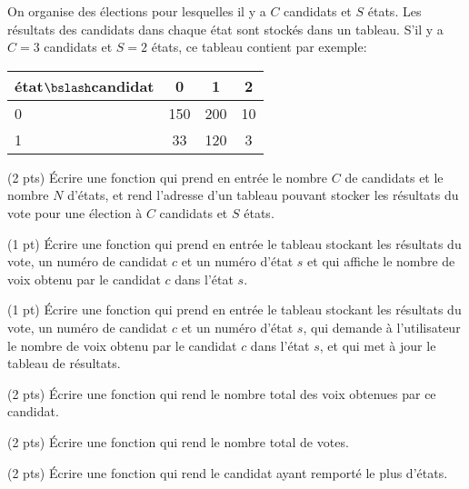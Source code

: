 
On organise des {\'e}lections pour lesquelles il y a $C$ candidats et $S$
{\'e}tats. Les r{\'e}sultats des candidats dans chaque {\'e}tat sont stock{\'e}s dans
un tableau. S'il y a $C=3$ candidats et $S=2$
{\'e}tats, ce tableau contient par exemple:
\begin{center}
  \begin{tabular}{|l|c|c|c|}
    \hline
    {\'e}tat$\bslash$candidat & 0 & 1 & 2 \\
    \hline
    0 & 150 & 200 & 10 \\
    \hline
    1 & 33 & 120 & 3 \\
    \hline
  \end{tabular}
\end{center}


\question (2 pts) {\'E}crire une fonction  qui prend en
  entr{\'e}e le nombre $C$ de candidats et le nombre $N$ d'{\'e}tats, et rend
  l'adresse d'un tableau pouvant stocker les
  r{\'e}sultats du vote pour une {\'e}lection {\`a} $C$ candidats et $S$ {\'e}tats.

\question (1 pt) {\'E}crire une fonction  qui prend
  en entr{\'e}e le tableau stockant les r{\'e}sultats du vote, un num{\'e}ro de
  candidat $c$ et un num{\'e}ro d'{\'e}tat $s$ et qui affiche le nombre de voix
  obtenu par le candidat $c$ dans l'{\'e}tat $s$.

\Question (1 pt) {\'E}crire une fonction  qui prend en
  entr{\'e}e le tableau stockant les r{\'e}sultats du vote, un num{\'e}ro de
  candidat $c$ et un num{\'e}ro d'{\'e}tat $s$, qui demande {\`a} l'utilisateur le
  nombre de voix obtenu par le candidat $c$ dans l'{\'e}tat $s$, et qui
  met {\`a} jour le tableau de r{\'e}sultats.

\Question (2 pts) {\'E}crire une fonction  qui rend le
  nombre total des voix obtenues par ce candidat.

\Question (2 pts) {\'E}crire une fonction  qui rend le nombre
total de votes.


\question (2 pts) {\'E}crire une fonction  qui rend le candidat
  ayant remport{\'e} le plus d'{\'e}tats.
